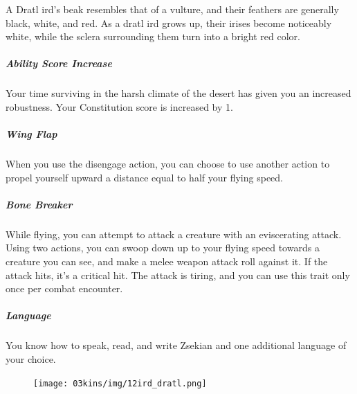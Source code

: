 \begin{linenumbers}
A Dratl ird's beak resembles that of a vulture, and their feathers are generally black, white, and red.
As a dratl ird grows up, their irises become noticeably white, while the sclera surrounding them turn into a bright red color.

\subparagraph{Ability Score Increase} Your time surviving in the harsh climate of the desert has given you an increased robustness.
Your Constitution score is increased by 1.

\subparagraph{Wing Flap} When you use the disengage action, you can choose to use another action to propel yourself upward a distance equal to half your flying speed.

\subparagraph{Bone Breaker} While flying, you can attempt to attack a creature with an eviscerating attack.
Using two actions, you can swoop down up to your flying speed towards a creature you can see, and make a melee weapon attack roll against it.
If the attack hits, it's a critical hit.
The attack is tiring, and you can use this trait only once per combat encounter.

\subparagraph{Language} You know how to speak, read, and write Zsekian and one additional language of your choice.

\begin{figure}[!b]
    \centering
    \texttt{[image: 03kins/img/12ird\_dratl.png]}
\end{figure}
\end{linenumbers}

\newpage
